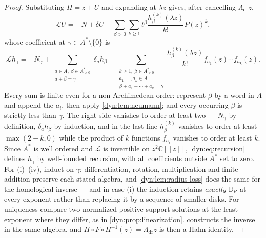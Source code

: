 \documentclass[11pt,letterpaper]{article}
\theoremstyle{definition}
\theoremstyle{remark}
\newcommand{\C}{\mathbb C}
\newcommand{\Li}{\mathcal L}
\numberwithin{equation}{section}
\begin{document}
\begin{proof}
Substituting $H=z+U$ and expanding at $\lambda z$ gives, after cancelling
$\Lambda_{\mathrm{dr}}z$,
\begin{equation}\label{dyn:eq:masterrecursion}
 \Li U=-N+\delta U-\sum_{\beta>0}\sum_{k\ge1}t^{\beta}
 \frac{h_\beta^{(k)}(\lambda z)}{k!}P(z)^{k},
\end{equation}
whose coefficient at $\gamma\in A^{*}\setminus\{0\}$ is
\begin{equation}\label{dyn:eq:recursion}
 \Li h_\gamma=-N_\gamma
 +\sum_{\substack{a\in A,\ \beta\in A^{*}_{>0}\\ a+\beta=\gamma}}\delta_ah_\beta
 -\sum_{\substack{k\ge1,\ \beta\in A^{*}_{>0}\\ a_1,\dots,a_k\in A\\
 \beta+a_1+\cdots+a_k=\gamma}}
 \frac{h_\beta^{(k)}(\lambda z)}{k!}f_{a_1}(z)\cdots f_{a_k}(z).
\end{equation}
Every sum is finite even for a non-Archimedean order: represent $\beta$ by
a word in $A$ and append the $a_i$, then apply \cref{dyn:lem:neumann}; and
every occurring $\beta$ is strictly less than $\gamma$. The right side
vanishes to order at least two --- $N_\gamma$ by definition, $\delta_ah_\beta$
by induction, and in the last line $h_\beta^{(k)}$ vanishes to order at
least $\max(2-k,0)$ while the product of $k$ functions $f_{a_i}$ vanishes
to order at least $k$. Since $A^{*}$ is well ordered and $\Li$ is
invertible on $z^{2}\C[[z]]$, \eqref{dyn:eq:recursion} defines $h_\gamma$
by well-founded recursion, with all coefficients outside $A^{*}$ set to
zero. For (i)--(iv), induct on $\gamma$: differentiation, rotation,
multiplication and finite addition preserve each stated algebra, and
\cref{dyn:lem:radius-loss} does the same for the homological inverse ---
and in case (i) the induction retains \emph{exactly} $\mathbb D_R$ at every
exponent rather than replacing it by a sequence of smaller disks. For
uniqueness compare two normalized positive-support solutions at the least
exponent where they differ, as in \cref{dyn:prop:linearization}.
 constructs the inverse in the same algebra, and
$H\circ F\circ H^{-1}(z)=\Lambda_{\mathrm{dr}}z$ is then a Hahn identity.
\end{proof}
\end{document}
